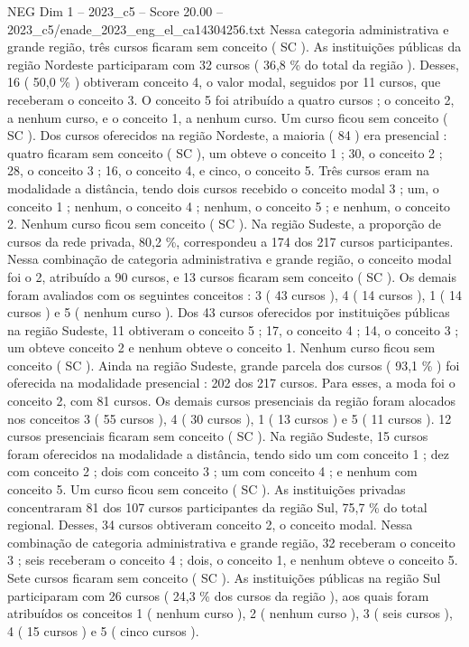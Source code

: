 \begin{textsample}{NEG Dim 1 – 2023\_c5 – Score 20.00 – 2023\_c5/enade\_2023\_eng\_el\_ca14304256.txt}
Nessa categoria administrativa e grande região, três cursos ficaram sem conceito ( SC ).
As instituições públicas da região Nordeste participaram com 32 cursos ( 36,8 \% do total da região ).
Desses, 16 ( 50,0 \% ) obtiveram conceito 4, o valor modal, seguidos por 11 cursos, que receberam o conceito 3.
O conceito 5 foi atribuído a quatro cursos ; o conceito 2, a nenhum curso, e o conceito 1, a nenhum curso.
Um curso ficou sem conceito ( SC ).
Dos cursos oferecidos na região Nordeste, a maioria ( 84 ) era presencial : quatro ficaram sem conceito ( SC ), um obteve o conceito 1 ; 30, o conceito 2 ; 28, o conceito 3 ; 16, o conceito 4, e cinco, o conceito 5.
Três cursos eram na modalidade a distância, tendo dois cursos recebido o conceito modal 3 ; um, o conceito 1 ; nenhum, o conceito 4 ; nenhum, o conceito 5 ; e nenhum, o conceito 2.
Nenhum curso ficou sem conceito ( SC ).
Na região Sudeste, a proporção de cursos da rede privada, 80,2 \%, correspondeu a 174 dos 217 cursos participantes.
Nessa combinação de categoria administrativa e grande região, o conceito modal foi o 2, atribuído a 90 cursos, e 13 cursos ficaram sem conceito ( SC ).
Os demais foram avaliados com os seguintes conceitos : 3 ( 43 cursos ), 4 ( 14 cursos ), 1 ( 14 cursos ) e 5 ( nenhum curso ).
Dos 43 cursos oferecidos por instituições públicas na região Sudeste, 11 obtiveram o conceito 5 ; 17, o conceito 4 ; 14, o conceito 3 ; um obteve conceito 2 e nenhum obteve o conceito 1.
Nenhum curso ficou sem conceito ( SC ).
Ainda na região Sudeste, grande parcela dos cursos ( 93,1 \% ) foi oferecida na modalidade presencial : 202 dos 217 cursos.
Para esses, a moda foi o conceito 2, com 81 cursos.
Os demais cursos presenciais da região foram alocados nos conceitos 3 ( 55 cursos ), 4 ( 30 cursos ), 1 ( 13 cursos ) e 5 ( 11 cursos ). 12 cursos presenciais ficaram sem conceito ( SC ).
Na região Sudeste, 15 cursos foram oferecidos na modalidade a distância, tendo sido um com conceito 1 ; dez com conceito 2 ; dois com conceito 3 ; um com conceito 4 ; e nenhum com conceito 5.
Um curso ficou sem conceito ( SC ).
As instituições privadas concentraram 81 dos 107 cursos participantes da região Sul, 75,7 \% do total regional.
Desses, 34 cursos obtiveram conceito 2, o conceito modal.
Nessa combinação de categoria administrativa e grande região, 32 receberam o conceito 3 ; seis receberam o conceito 4 ; dois, o conceito 1, e nenhum obteve o conceito 5.
Sete cursos ficaram sem conceito ( SC ).
As instituições públicas na região Sul participaram com 26 cursos ( 24,3 \% dos cursos da região ), aos quais foram atribuídos os conceitos 1 ( nenhum curso ), 2 ( nenhum curso ), 3 ( seis cursos ), 4 ( 15 cursos ) e 5 ( cinco cursos ).

\end{textsample}
